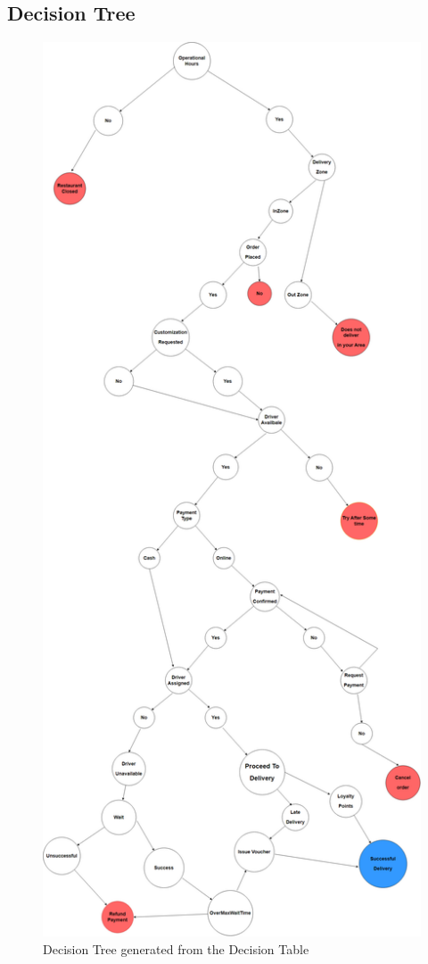 \documentclass{article}
\begin{document}
\subsection{Decision Tree}
\begin{figure}[htbp]
    \centering
    \includegraphics[keepaspectratio, width=\linewidth, height=\textheight]{DecisionTree.png}
    \caption{Decision Tree generated from the Decision Table}
    \label{fig:decision_tree}
\end{figure}
\end{document}
